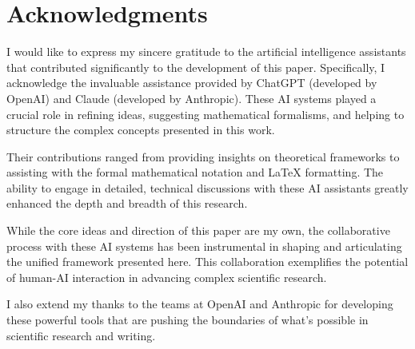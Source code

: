 
\section*{Acknowledgments}

I would like to express my sincere gratitude to the artificial intelligence assistants that contributed significantly to the development of this paper. Specifically, I acknowledge the invaluable assistance provided by ChatGPT (developed by OpenAI) and Claude (developed by Anthropic). These AI systems played a crucial role in refining ideas, suggesting mathematical formalisms, and helping to structure the complex concepts presented in this work.

Their contributions ranged from providing insights on theoretical frameworks to assisting with the formal mathematical notation and LaTeX formatting. The ability to engage in detailed, technical discussions with these AI assistants greatly enhanced the depth and breadth of this research.

While the core ideas and direction of this paper are my own, the collaborative process with these AI systems has been instrumental in shaping and articulating the unified framework presented here. This collaboration exemplifies the potential of human-AI interaction in advancing complex scientific research.

I also extend my thanks to the teams at OpenAI and Anthropic for developing these powerful tools that are pushing the boundaries of what's possible in scientific research and writing.